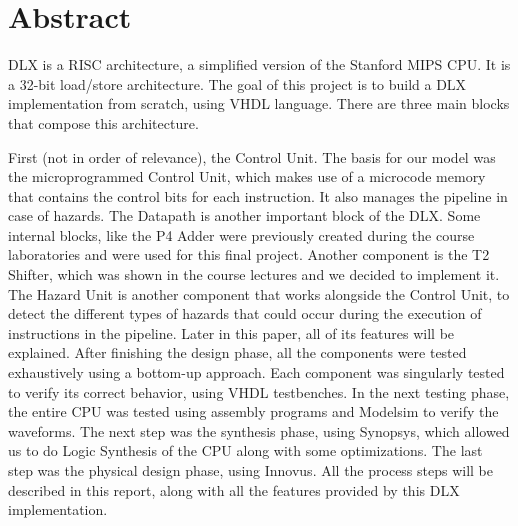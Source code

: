 %
% 
\chapter{Abstract}
\label{Abstract}


DLX is a RISC architecture, a simplified version of the Stanford MIPS CPU.
It is a 32-bit load/store architecture. The goal of this project is to build a DLX implementation
from scratch, using VHDL language. There are three main blocks that compose this architecture.

First (not in order of relevance), the Control Unit. The basis for our model was the microprogrammed Control Unit, which makes
use of a microcode memory that contains the control bits for each instruction. It also manages the pipeline in case of hazards.
The Datapath is another important block of the DLX. Some internal blocks, like the P4 Adder were previously created during the course laboratories
and were used for this final project. Another component is the T2 Shifter, which was shown in the course lectures and we decided to implement it.
The Hazard Unit is another component that works alongside the Control Unit, to detect the different types of hazards that could occur during the
execution of instructions in the pipeline. Later in this paper, all of its features will be explained.
After finishing the design phase, all the components were tested exhaustively using a bottom-up approach.
Each component was singularly tested to verify its correct behavior, using VHDL testbenches.
In the next testing phase, the entire CPU was tested using assembly programs and Modelsim to verify the waveforms.
The next step was the synthesis phase, using Synopsys, which allowed us to do Logic Synthesis of the CPU along with some optimizations.
The last step was the physical design phase, using Innovus.
All the process steps will be described in this report, along with all the features provided by this DLX implementation.


